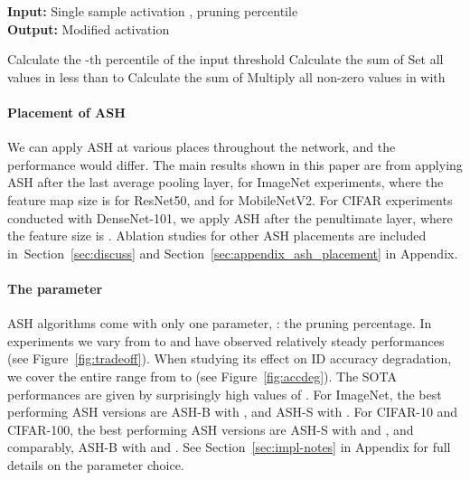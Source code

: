 \documentclass{article}
\newcommand{\figref}[1]{Figure~\ref{fig:#1}}
\newcommand{\secref}[1]{Section~\ref{sec:#1}}
\newcommand{\alglabel}[1]{\label{alg:#1}}
\newcommand{\ac}{ASH\xspace}
\begin{document}
\hfill
\begin{minipage}{0.34\textwidth}
    \begin{algorithm}[H]
    \small
    	\caption{\textbf{\textcolor{ashscolor}{ASH-S: Activation Shaping with Scaling}}}
\textbf{Input:} Single sample activation , pruning percentile \\
        \textbf{Output:} Modified activation \\
        \begin{algorithmic}[1]
            \STATE Calculate the -th percentile of the input   threshold 
            \STATE Calculate the sum of   
            \STATE Set all values in  less than  to 
            \STATE Calculate the sum of   
        	\vspace{0.35cm}
            \STATE Multiply all non-zero values in  with 
            \RETURN 
        \end{algorithmic}
    	\alglabel{ash-s}
    \end{algorithm}
\end{minipage}

\paragraph{Placement of ASH} 
We can apply \ac at various places throughout the network, and the performance would differ. The main results shown in this paper are from applying \ac after the last average pooling layer, for ImageNet experiments, where the feature map size is  for ResNet50, and  for MobileNetV2. For CIFAR experiments conducted with DenseNet-101, we apply \ac after the penultimate layer, where the feature size is . Ablation studies for other ASH placements are included in~\secref{discuss} and \secref{appendix_ash_placement} in Appendix.



\paragraph{The  parameter} \ac algorithms come with only one parameter, : the pruning percentage. In experiments we vary  from  to  and have observed relatively steady performances (see \figref{tradeoff}). When studying its effect on ID accuracy degradation, we cover the entire range from  to  (see \figref{accdeg}). The SOTA performances are given by surprisingly high values of . For ImageNet, the best performing ASH versions are ASH-B with , and ASH-S with . For CIFAR-10 and CIFAR-100, the best performing ASH versions are ASH-S with  and , and comparably, ASH-B with  and . See \secref{impl-notes} in Appendix for full details on the parameter choice. 
\end{document}
